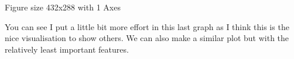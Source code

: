 \documentclass[letterpaper,10pt,english]{jupyterBook}
\begin{document}
\begin{sphinxVerbatim}[commandchars=\\\{\}]
                         
                       
                     
\end{sphinxVerbatim}

\begin{sphinxVerbatim}[commandchars=\\\{\}]
\PYGZlt{}Figure size 432x288 with 1 Axes\PYGZgt{}
\end{sphinxVerbatim}

\sphinxAtStartPar
You can see I put a little bit more effort in this last graph as I think this is the nice visualisation to show others. We can also make a similar plot but with the relatively least important features.
\end{document}
